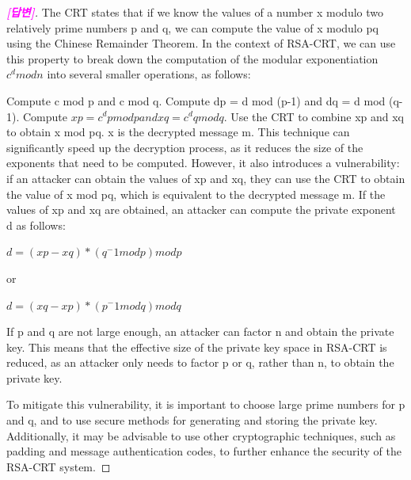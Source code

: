 \documentclass{article}
\begin{document}
\begin{itemize}
\begin{proof}[\normalfont\bf\textcolor{magenta}{[답변]}]
			The CRT states that if we know the values of a number x modulo two relatively prime numbers p and q, we can compute the value of x modulo pq using the Chinese Remainder Theorem. In the context of RSA-CRT, we can use this property to break down the computation of the modular exponentiation $c^d mod n$ into several smaller operations, as follows:
			
			Compute c mod p and c mod q.
			Compute dp = d mod (p-1) and dq = d mod (q-1).
			Compute $xp = c^dp mod p and xq = c^dq mod q$.
			Use the CRT to combine xp and xq to obtain x mod pq.
			x is the decrypted message m.
			This technique can significantly speed up the decryption process, as it reduces the size of the exponents that need to be computed. However, it also introduces a vulnerability: if an attacker can obtain the values of xp and xq, they can use the CRT to obtain the value of x mod pq, which is equivalent to the decrypted message m. If the values of xp and xq are obtained, an attacker can compute the private exponent d as follows:
			
			$d = (xp - xq) * (q^-1 mod p) mod p$
			
			or
			
			$d = (xq - xp) * (p^-1 mod q) mod q$
			
			If p and q are not large enough, an attacker can factor n and obtain the private key. This means that the effective size of the private key space in RSA-CRT is reduced, as an attacker only needs to factor p or q, rather than n, to obtain the private key.
			
			To mitigate this vulnerability, it is important to choose large prime numbers for p and q, and to use secure methods for generating and storing the private key. Additionally, it may be advisable to use other cryptographic techniques, such as padding and message authentication codes, to further enhance the security of the RSA-CRT system.
		\end{proof}
	\end{itemize}
	
\end{document}
